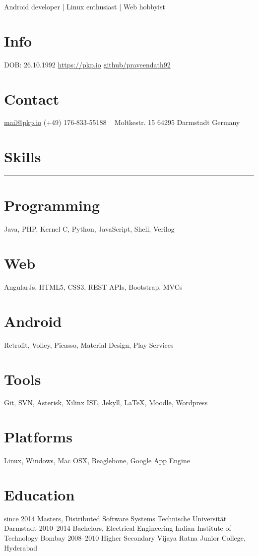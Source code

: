 \documentclass[]{friggeri-cv}
\begin{document}
       {Android developer | Linux enthusiast | Web hobbyist}

\begin{aside}
  \section{Info}
    DOB: 26.10.1992
    \href{https://pkp.io}{https://pkp.io}
    \href{http://github.com/praveendath92}{github/praveendath92}
  \section{Contact}
    \href{mailto:mail@pkp.io}{mail@pkp.io}
    (+49) 176-833-55188
    ~
    Moltkestr. 15
    64295 Darmstadt
    Germany
    ~
  \section{Skills}
    \noindent\rule{3cm}{0.5pt}
  \section{Programming}
    Java, PHP, Kernel C, Python, JavaScript, Shell, Verilog
  \section{Web}
    AngularJs, HTML5, CSS3, REST APIs, Bootstrap, MVCs
  \section{Android}
    Retrofit, Volley, Picasso, Material Design, Play Services
  \section{Tools}
    Git, SVN, Asterisk, Xilinx ISE, Jekyll, \LaTeX, Moodle, Wordpress
  \section{Platforms}
    Linux, Windows, Mac OSX, Beaglebone, Google App Engine
\end{aside}


\section{Education}

\begin{entrylist}
  \entry
    {since 2014}
    {Masters, {\normalfont Distributed Software Systems}}
    {Technische Universität Darmstadt}
    {}%
  \entry
    {2010–2014}
    {Bachelors, {\normalfont Electrical Engineering}}
    {Indian Institute of Technology Bombay}
    {}%
  \entry
    {2008–2010}
    {Higher Secondary}
    {Vijaya Ratna Junior College, Hyderabad}
    {}%
\end{entrylist}
\end{document}
